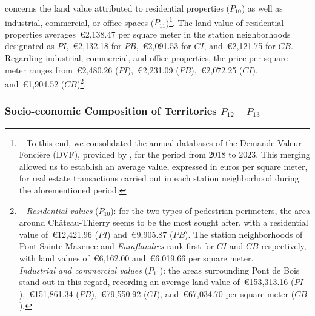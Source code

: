 \begin{refsegment}
 concerns the land value attributed to residential properties (\(P_{10}\)) as well as industrial, commercial, or office spaces (\(P_{11}\))\footnote{~
    To this end, we consolidated the annual databases of the Demande Valeur Foncière (DVF), provided by \textcolor{blue}{\textcite{direction_generale_des_finances_publiques_demandes_2024}}, for the period from 2018 to 2023. This merging allowed us to establish an average value, expressed in euros per square meter, for real estate transactions carried out in each station neighborhood during the aforementioned period.
}. The land value of residential properties averages~\euro2,138.47 per square meter in the station neighborhoods designated as \(PI\),~\euro2,132.18 for \(PB\),~\euro2,091.53 for \(CI\), and~\euro2,121.75 for \(CB\). Regarding industrial, commercial, and office properties, the price per square meter ranges from~\euro2,480.26 (\(PI\)),~\euro2,231.09 (\(PB\)),~\euro2,072.25 (\(CI\)), and~\euro1,904.52 (\(CB\))\footnote{~
    \textsl{Residential values} (\(P_{10}\)): for the two types of pedestrian perimeters, the area around Château-Thierry seems to be the most sought after, with a residential value of~\euro12,421.96 (\(PI\)) and~\euro9,905.87 (\(PB\)). The station neighborhoods of Pont-Sainte-Maxence and \textsl{Euraflandres} rank first for \(CI\) and \(CB\) respectively, with land values of~\euro6,162.00 and~\euro6,019.66 per square meter.
    \\
    \textsl{Industrial and commercial values} (\(P_{11}\)): the areas surrounding Pont de Bois stand out in this regard, recording an average land value of~\euro153,313.16 (\(PI\)),~\euro151,861.34 (\(PB\)),~\euro79,550.92 (\(CI\)), and~\euro67,034.70 per square meter (\(CB\)).
}.%

\subsubsection*{Socio-economic Composition of Territories \(P_{12} - P_{13}\)
    \label{chap6:indicateurs-place-sociodemographie}
    }
    

\end{refsegment}

